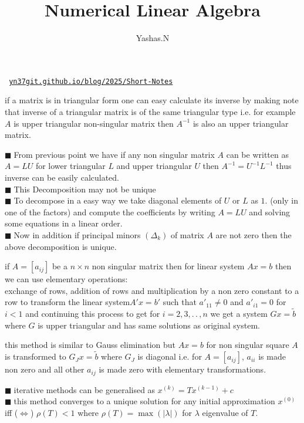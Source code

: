 \documentclass[11pt]{extarticle}
\author{Yashas.N}
\title{Numerical Linear Algebra}
\date{}
\newcommand{\ck}{.\,.\,}
\newcommand{\tm}{\times}
\newcommand{\snote}[1]{{\footnotesize(#1)}}
\newcommand{\tbx}[2][]{
\begin{tcolorbox}[enhanced,breakable,size=small,colback=black!2!white,title={#1},arc is angular, arc=1.5mm,drop fuzzy shadow]
	#2
\end{tcolorbox}
}
\newcommand{\y}{$\blacksquare\;$}
\begin{document}
\maketitle
\begin{center}\texttt{
		\href{https://yn37git.github.io/blog/2025/Short-Notes/}{yn37git.github.io/blog/2025/Short-Notes}}
\end{center} 

	\begin{multicols}{2}
		\tbx[]{if a matrix is in triangular form one can easy calculate its inverse by making note that inverse of a triangular 
			matrix is of the same triangular type i.e. for example $ A $ is upper triangular non-singular matrix then 
			$ A^{-1} $ is also an upper triangular matrix.}
			\tbx[$LU$ Decomposition]{
				\y From previous point we have if any non singular matrix $ A $ can be written as $ A=LU $ for lower triangular $ L $ and upper triangular $ U $ then $ A^{-1}=U^{-1}L^{-1} $ thus inverse can be easily calculated.\\  
				\y This Decomposition may not be unique\\
				\y To decompose in a easy way we take diagonal elements of $ U $ or $ L $ as $ 1. $ (only in one of the factors) and compute the coefficients by writing $ A=LU $ and solving some equations  in a linear order.\\
				\y Now in addition if principal minors $ (\Delta_k) $ of matrix $ A $ are not zero then the above decomposition is unique.}
				\tbx[Gauss elimination]{
				if $ A=[a_{ij}] $ be a $ n\tm n $ non singular matrix then for linear system $ Ax=b$ then we can use elementary operations:\\
				exchange of rows, addition of rows and multiplication by a non zero constant to a row to transform the  linear system$A'x=b'$ such that $ a'_{11}\neq 0  $ and $ a'_{i1}=0 $ for $ i<1 $  and continuing this process to get for $ i= 2,3,\ck, n$ we get a system $ Gx=\tilde{b} $ where $ G $ is upper triangular and has same solutions as original system.}
				\tbx[Gauss-Jordan method]{ this method is similar to Gauss elimination but $ Ax=b $ for non singular square $ A $ is transformed to $ G_Jx=\tilde{b} $ where $ G_J $ is diagonal i.e. for $ A=[a_{ij}] $, $ a_{ii} $ is made non zero and all other $ a_{ij} $ is made zero with elementary transformations.}
			  \tbx[General Iterative methods]{
			  \y iterative methods can be generalised as $ x^{(k)} =Tx^{(k-1)}+c$ \\
			  \y this method converges to a unique solution for any initial approximation $ x^{(0)} $ iff \snote{$\iff$} $ \rho(T)<1$ where $\rho(T)=\max(|\lambda|) $ for $ \lambda $ eigenvalue of $ T. $ }

\end{multicols}
\end{document}
